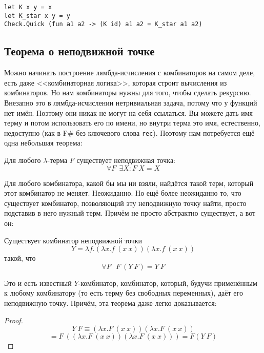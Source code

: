 \documentclass{../../text-style}
\begin{document}
\begin{verbatim}
let K x y = x
let K_star x y = y
Check.Quick (fun a1 a2 -> (K id) a1 a2 = K_star a1 a2)
\end{verbatim}

\subsection{Теорема о неподвижной точке}

Можно начинать построение лямбда-исчисления с комбинаторов на самом деле, есть даже <<комбинаторная логика>>, которая строит вычисления из комбинаторов. Но нам комбинаторы нужны для того, чтобы сделать рекурсию. Внезапно это в лямбда-исчислении нетривиальная задача, потому что у функций нет имён. Поэтому они никак не могут на себя ссылаться. Вы можете дать имя терму и потом использовать его по имени, но внутри терма это имя, естественно, недоступно (как в F\# без ключевого слова \texttt{rec}). Поэтому нам потребуется ещё одна небольшая теорема:

\begin{rustheorem}
    Для любого $\lambda$-терма $F$ существует неподвижная точка:
    $$\forall F\ \ \exists X : F\ X = X$$
\end{rustheorem}

Для любого комбинатора, какой бы мы ни взяли, найдётся такой терм, который этот комбинатор не меняет. Неожиданно. Но ещё более неожиданно то, что существует комбинатор, позволяющий эту неподвижную точку найти, просто подставив в него нужный терм. Причём не просто абстрактно существует, а вот он:

\begin{rustheorem}
    Существует комбинатор неподвижной точки
    $$Y = \lambda f.(\lambda x.f\ (x\ x)) (\lambda x.f\ (x\ x))$$
    такой, что 
    $$\forall F\ \ \ F\ (Y\ F) = Y\ F$$
\end{rustheorem}

Это и есть известный $Y$-комбинатор, комбинатор, который, будучи применённым к любому комбинатору (то есть терму без свободных переменных), даёт его неподвижную точку. Причём, эта теорема даже легко доказывается:

\begin{proof}
    $$Y\ F \equiv (\lambda x.F\ (x\ x))(\lambda x.F\ (x\ x))$$
    $$    = F\ ((\lambda x.F\ (x\ x))(\lambda x.F\ (x\ x))) = F(Y\ F)$$
\end{proof}
\end{document}
